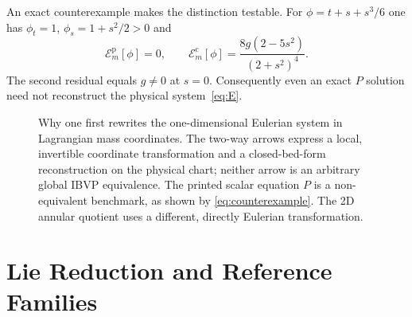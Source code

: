 \documentclass[12pt,a4paper,oneside]{report}
\numberwithin{equation}{chapter}
\theoremstyle{remark}\newtheorem{remark}[theorem]{Remark}
\newcommand{\E}{\mathcal E}
\begin{document}
An exact counterexample makes the distinction testable. For
$\phi=t+s+s^3/6$ one has $\phi_t=1$, $\phi_s=1+s^2/2>0$ and
\begin{equation}\label{eq:counterexample}
 \E_m^{\mathrm p}[\phi]=0,\qquad
 \E_m^{\mathrm c}[\phi]=\frac{8g(2-5s^2)}{(2+s^2)^4}.
\end{equation}
The second residual equals $g\ne0$ at $s=0$. Consequently even an exact
$P$ solution need not reconstruct the physical system~\eqref{eq:E}.

\begin{figure}[htbp]\centering
{}
\caption[Eulerian, material and printed scalar models]{Why one first rewrites the one-dimensional Eulerian system in
Lagrangian mass coordinates. The two-way arrows express a local, invertible
coordinate transformation and a closed-bed-form reconstruction on the
physical chart; neither arrow is an arbitrary global IBVP equivalence.
The printed scalar equation $P$ is a non-equivalent benchmark, as shown by
\eqref{eq:counterexample}. The 2D annular quotient uses a different,
directly Eulerian transformation.}\label{fig:EMPtriangle}
\end{figure}

\FloatBarrier
\chapter{Lie Reduction and Reference Families}\label{ch:lie}
\end{document}
